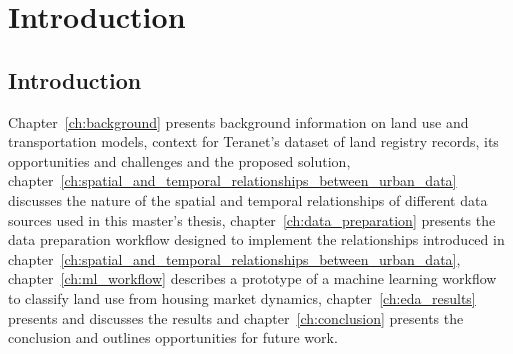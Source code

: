 \chapter[Introduction]{Introduction} \label{ch:introduction}

\section{Introduction} \label{sec:introduction}

Chapter~\ref{ch:background} presents background information on land use and transportation models, context for Teranet's dataset of land registry records, its opportunities and challenges and the proposed solution, chapter~\ref{ch:spatial_and_temporal_relationships_between_urban_data} discusses the nature of the spatial and temporal relationships of different data sources used in this master's thesis, chapter~\ref{ch:data_preparation} presents the data preparation workflow designed to implement the relationships introduced in chapter~\ref{ch:spatial_and_temporal_relationships_between_urban_data}, chapter~\ref{ch:ml_workflow} describes a prototype of a machine learning workflow to classify land use from housing market dynamics, chapter~\ref{ch:eda_results} presents and discusses the results and chapter~\ref{ch:conclusion} presents the conclusion and outlines opportunities for future work.
